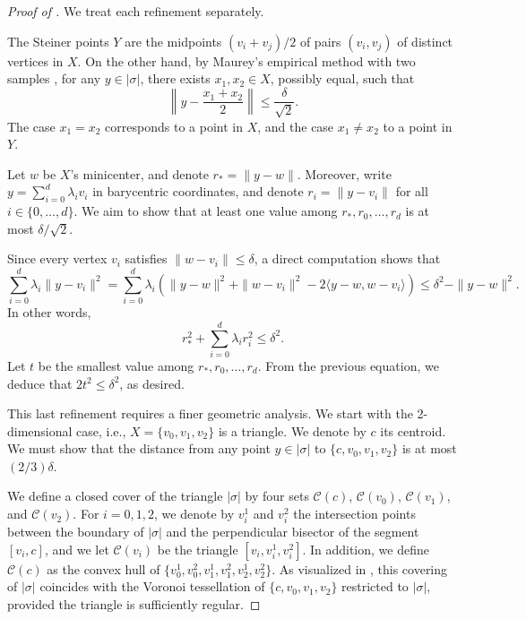 \documentclass[a4paper,english,cleveref,autoref,thm-restate,nolineno]{socg-lipics-v2021}
\newcommand{\geomreal}[1] { |#1| } %
\begin{document}
\begin{proof}[Proof of ]
	We treat each refinement separately.
	
	The Steiner points $Y$ are the midpoints $(v_i+v_j)/2$ of pairs $(v_i,v_j)$ of distinct vertices in $X$.
	On the other hand, by Maurey's empirical method with two samples \cite[Theorem 0.0.2]{VershyninHDP2}, for any $y \in \geomreal{\sigma}$, there exists $x_1,x_2\in X$, possibly equal, such that
	\[
	\left\|y-\frac{x_1+x_2}{2} \right\|
	\leq
	\frac{\delta}{\sqrt{2}}.
	\]
	The case $x_1=x_2$ corresponds to a point in $X$, and the case $x_1\neq x_2$ to a point in $Y$.
	
	Let $w$ be $X$'s minicenter, and denote $r_*=\|y-w\|$.
	Moreover, write $y = \sum_{i=0}^{d}\lambda_i v_i$ in barycentric coordinates, and denote $r_i = \|y-v_i\|$ for all $i\in\{0,\dots,d\}$.
	We aim to show that at least one value among $r_*,r_0,\dots,r_d$ is at most $\delta/\sqrt{2}$.
	
	Since every vertex $v_i$ satisfies $\|w-v_i\|\leq \delta$, a direct computation shows that	
	\[
	\sum_{i=0}^{d}\lambda_i \|y-v_i\|^2 
	= \sum_{i=0}^{d}\lambda_i \left(\|y-w\|^2+\|w-v_i\|^2-2\langle y-w,w-v_i\rangle\right) 
	\leq \delta^2 - \|y-w\|^2. 
	\]  
	In other words, 
	\[
	r_*^2+	\sum_{i=0}^{d}\lambda_ir_i^2 \leq \delta^2.
	\]
	Let $t$ be the smallest value among $r_*,r_0,\dots,r_d$.
	From the previous equation, we deduce that $2 t^2 \leq \delta^2$, as desired.
	
	This last refinement requires a finer geometric analysis.
	We start with the 2-dimensional case, i.e., $X = \{v_0,v_1,v_2\}$ is a triangle.
	We denote by $c$ its centroid.
	We must show that the distance from any point $y\in\geomreal{\sigma}$ to $\{c,v_0,v_1,v_2\}$ is at most $(2/3)\delta$.
	
	We define a closed cover of the triangle $\geomreal{\sigma}$ by four sets $\mathcal{C}(c)$, $\mathcal{C}(v_0)$, $\mathcal{C}(v_1)$, and $\mathcal{C}(v_2)$.
	For $i=0,1,2$, we denote by $v_i^1$ and $v_i^2$ the intersection points between the boundary of $\geomreal{\sigma}$ and the perpendicular bisector of the segment $[v_i,c]$, and we let $\mathcal{C}(v_i)$ be the triangle $[v_i, v_i^1, v_i^2]$.
	In addition, we define $\mathcal{C}(c)$ as the convex hull of $\{v_0^1, v_0^2, v_1^1, v_1^2, v_2^1, v_2^2\}$.
	As visualized in , this covering of $\geomreal{\sigma}$ coincides with the Voronoi tessellation of $\{c,v_0,v_1,v_2\}$ restricted to $\geomreal{\sigma}$, provided the triangle is sufficiently regular.
	

\end{proof}
\end{document}

